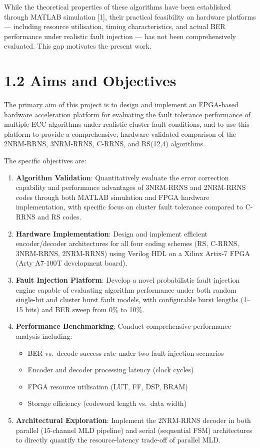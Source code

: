 \documentclass[
  english,
  12pt,
]{report}
\providecommand{\tightlist}{%
  \setlength{\itemsep}{0pt}\setlength{\parskip}{0pt}}
\begin{document}
While the theoretical properties of these algorithms have been
established through MATLAB simulation {[}1{]}, their practical
feasibility on hardware platforms --- including resource utilisation,
timing characteristics, and actual BER performance under realistic fault
injection --- has not been comprehensively evaluated. This gap motivates
the present work.

\section{1.2 Aims and Objectives}\label{aims-and-objectives}

The primary aim of this project is to design and implement an FPGA-based
hardware acceleration platform for evaluating the fault tolerance
performance of multiple ECC algorithms under realistic cluster fault
conditions, and to use this platform to provide a comprehensive,
hardware-validated comparison of the 2NRM-RRNS, 3NRM-RRNS, C-RRNS, and
RS(12,4) algorithms.

The specific objectives are:

\begin{enumerate}
\def\labelenumi{\arabic{enumi}.}
\tightlist
\item
  \textbf{Algorithm Validation}: Quantitatively evaluate the error
  correction capability and performance advantages of 3NRM-RRNS and
  2NRM-RRNS codes through both MATLAB simulation and FPGA hardware
  implementation, with specific focus on cluster fault tolerance
  compared to C-RRNS and RS codes.
\item
  \textbf{Hardware Implementation}: Design and implement efficient
  encoder/decoder architectures for all four coding schemes (RS, C-RRNS,
  3NRM-RRNS, 2NRM-RRNS) using Verilog HDL on a Xilinx Artix-7 FPGA (Arty
  A7-100T development board).
\item
  \textbf{Fault Injection Platform}: Develop a novel probabilistic fault
  injection engine capable of evaluating algorithm performance under
  both random single-bit and cluster burst fault models, with
  configurable burst lengths (1--15 bits) and BER sweep from 0\% to
  10\%.
\item
  \textbf{Performance Benchmarking}: Conduct comprehensive performance
  analysis including:

  \begin{itemize}
  \tightlist
  \item
    BER vs.~decode success rate under two fault injection scenarios
  \item
    Encoder and decoder processing latency (clock cycles)
  \item
    FPGA resource utilisation (LUT, FF, DSP, BRAM)
  \item
    Storage efficiency (codeword length vs.~data width)
  \end{itemize}
\item
  \textbf{Architectural Exploration}: Implement the 2NRM-RRNS decoder in
  both parallel (15-channel MLD pipeline) and serial (sequential FSM)
  architectures to directly quantify the resource-latency trade-off of
  parallel MLD.
\end{enumerate}
\end{document}

